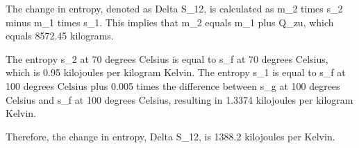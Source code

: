 The change in entropy, denoted as Delta S_12, is calculated as m_2 times s_2 minus m_1 times s_1. This implies that m_2 equals m_1 plus Q_zu, which equals 8572.45 kilograms.

The entropy s_2 at 70 degrees Celsius is equal to s_f at 70 degrees Celsius, which is 0.95 kilojoules per kilogram Kelvin. The entropy s_1 is equal to s_f at 100 degrees Celsius plus 0.005 times the difference between s_g at 100 degrees Celsius and s_f at 100 degrees Celsius, resulting in 1.3374 kilojoules per kilogram Kelvin.

Therefore, the change in entropy, Delta S_12, is 1388.2 kilojoules per Kelvin.